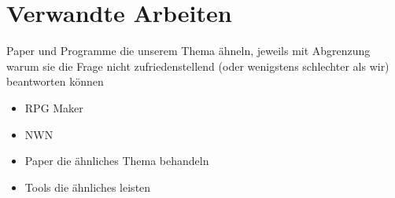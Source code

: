 \chapter{Verwandte Arbeiten}
\label{relatedwork}

Paper und Programme die unserem Thema ähneln, jeweils mit Abgrenzung warum sie die Frage nicht zufriedenstellend (oder wenigstens schlechter als wir) beantworten können
\begin{itemize}
	\item RPG Maker
	\item NWN
	\item Paper die ähnliches Thema behandeln
	\item Tools die ähnliches leisten
\end{itemize}

